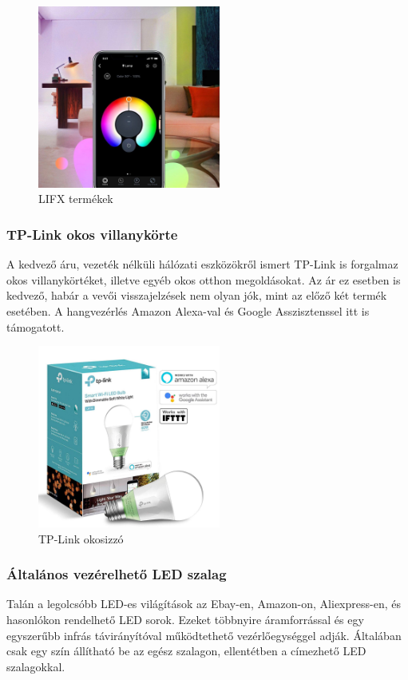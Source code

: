 \documentclass[../main.tex]{subfiles}
\begin{document}
\begin{figure}[h!]
                    \includegraphics[height=6cm]{irodalom_res/LIFX_app2}
                \caption{LIFX termékek\cite{led_lighting9}\cite{led_lighting10}}
                \label{fig:lifx}
             \end{figure}
        
        \subsubsection{TP-Link okos villanykörte}
            A kedvező áru, vezeték nélküli hálózati eszközökről ismert TP-Link is forgalmaz okos villanykörtéket, illetve egyéb okos otthon megoldásokat. Az ár ez esetben is kedvező, habár a vevői visszajelzések nem olyan jók, mint az előző két termék esetében. A hangvezérlés Amazon Alexa-val és Google Asszisztenssel itt is támogatott.\cite{led_lighting11}
            \begin{figure}[h!] 
                \centering
                    \includegraphics[height=6cm]{irodalom_res/tplink_bulb}
                \caption{TP-Link okosizzó\cite{led_lighting11}}
                \label{fig:tplink_bulb}
             \end{figure}
        
        \subsubsection{Általános vezérelhető LED szalag} 
            Talán a legolcsóbb LED-es világítások az Ebay-en, Amazon-on, Aliexpress-en, és hasonlókon rendelhető LED sorok. Ezeket többnyire áramforrással és egy egyszerűbb infrás távirányítóval működtethető vezérlőegységgel adják. Általában csak egy szín állítható be az egész szalagon, ellentétben a címezhető LED szalagokkal. \cite{led_lighting12}
            
\end{document}
